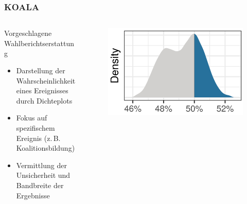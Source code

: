 \documentclass[aspectratio=169,xcolor=dvipsnames]{beamer}
\begin{document}
\begin{frame}
\frametitle{KOALA}
\begin{columns}
\begin{column}{0.6\textwidth}
Vorgeschlagene Wahlberichtserstattung
\begin{itemize}
\item Darstellung der Wahrscheinlichkeit eines Ereignisses durch Dichteplots
\item Fokus auf spezifischem Ereignis (z.\,B. Koalitionsbildung)
\item Vermittlung der Unsicherheit und Bandbreite der Ergebnisse
\end{itemize}
\end{column}
\begin{column}{0.4\textwidth}
\begin{figure}
\includegraphics[width=\textwidth]{poe}
\end{figure}
\end{column}
\end{columns}
\end{frame}
\end{document}
